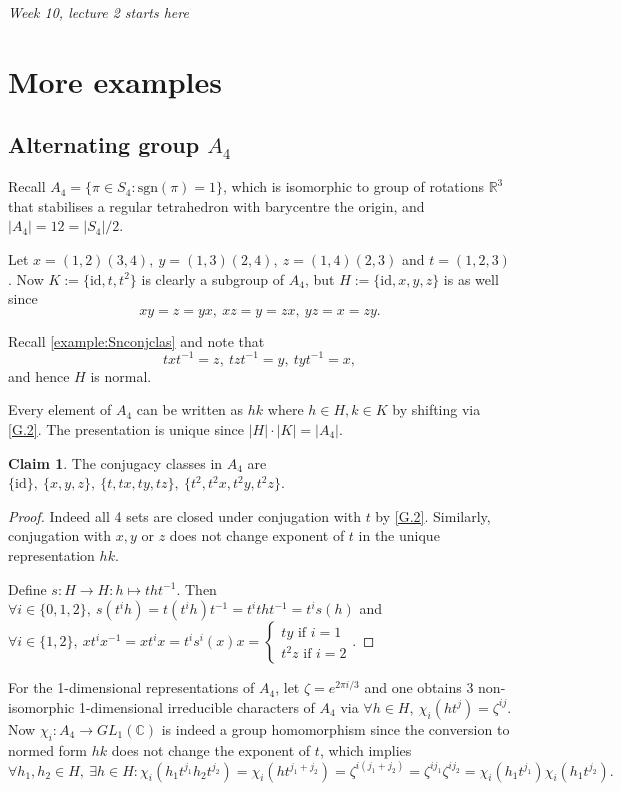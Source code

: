 \documentclass{article}
\newcommand{\sgn}{\text{sgn}}
\newcommand{\R}{\mathbb{R}}
\newcommand{\C}{\mathbb{C}}
\newcommand{\id}{\text{id}}
\theoremstyle{definition}
\newtheorem{claim}[defn]{Claim}
\begin{document}
\begin{flushright}
\textit{Week 10, lecture 2 starts here}
\end{flushright}

\section{More examples}
\subsection{Alternating group $A_4$}
Recall $A_4=\{\pi\in S_4:\sgn(\pi)=1\}$, which is isomorphic to group of rotations $\R^3$ that stabilises a regular tetrahedron with barycentre the origin, and $|A_4|=12=|S_4|/2$.

Let $x=(1,2)(3,4),\ y=(1,3)(2,4),\ z=(1,4)(2,3)$ and $t=(1,2,3)$. Now $K:=\{\id,t,t^2\}$ is clearly a subgroup of $A_4$, but $H:=\{\id,x,y,z\}$ is as well since
\[
\label{G.1}
\tag{G.1}
xy=z=yx,\ xz=y=zx,\ yz=x=zy.
\]

Recall \ref{example:Snconjclas} and note that
\[
\label{G.2}
\tag{G.2}
txt^{-1}=z,\ tzt^{-1}=y,\ tyt^{-1}=x,
\]
and hence $H$ is normal.

Every element of $A_4$ can be written as $hk$ where $h\in H,k\in K$ by shifting via \ref{G.2}. The presentation is unique since $|H|\cdot |K|=|A_4|$.

\begin{claim}
The conjugacy classes in $A_4$ are $\{\id\},\ \{x,y,z\},\ \{t,tx,ty,tz\},\ \{t^2,t^2x,t^2y,t^2z\}$.
\end{claim}
\begin{proof}
Indeed all 4 sets are closed under conjugation with $t$ by \ref{G.2}. Similarly, conjugation with $x,y$ or $z$ does not change exponent of $t$ in the unique representation $hk$.

Define $s:H\rightarrow H:h\mapsto tht^{-1}$. Then $\forall i\in\{0,1,2\},\ s(t^ih)=t(t^ih)t^{-1}=t^itht^{-1}=t^i s(h)$ and $\forall i\in\{1,2\},\ xt^ix^{-1}=xt^ix=t^is^i(x)x=\left\{ \begin{aligned}
  ty \text{ if }i=1 \\ t^2z\text{ if }i=2
\end{aligned} \right..$
\end{proof}

For the 1-dimensional representations of $A_4$, let $\zeta=e^{2\pi i/3}$ and one obtains 3 non-isomorphic 1-dimensional irreducible characters of $A_4$ via $\forall h\in H,\ \chi_i(ht^j)=\zeta^{ij}$. Now $\chi_i:A_4\rightarrow GL_1(\C)$ is indeed a group homomorphism since the conversion to normed form $hk$ does not change the exponent of $t$, which implies
\[
\forall h_1,h_2\in H,\ \exists h\in H:\chi_i(h_1t^{j_1}h_2t^{j_2})=\chi_i(ht^{j_1+j_2})=\zeta^{i(j_1+j_2)}=\zeta^{ij_1}\zeta^{ij_2}=\chi_i(h_1t^{j_1})\chi_i(h_1t^{j_2}).
\]
\end{document}
